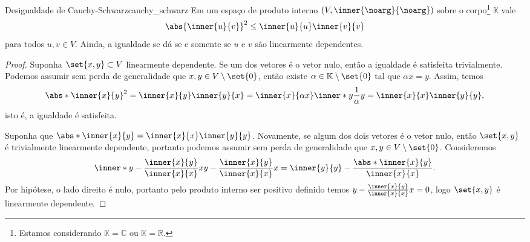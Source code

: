 \begin{lemma}{Desigualdade de Cauchy-Schwarz}{cauchy_schwarz}
    Em um espaço de produto interno \((V, \inner{\noarg}{\noarg})\) sobre o corpo\footnote{Estamos considerando \(\mathbb{K} = \mathbb{C}\) ou \(\mathbb{K} = \mathbb{R}.\)} \(\mathbb{K}\) vale
    \begin{equation*}
        \abs{\inner{u}{v}}^2 \leq \inner{u}{u} \inner{v}{v}
    \end{equation*}
    para todos \(u, v \in V.\) Ainda, a igualdade se dá se e somente se \(u\) e \(v\) são linearmente dependentes.
\end{lemma}
\begin{proof}
     Suponha \(\set{x,y} \subset V\) linearmente dependente. Se um dos vetores é o vetor nulo, então a igualdade é satisfeita trivialmente. Podemos assumir sem perda de generalidade que \(x, y \in V\setminus\set{0}\), então existe \(\alpha \in \mathbb{K}\setminus\set{0}\) tal que \(\alpha x = y\). Assim, temos
    \begin{equation*}
        \abs*{\inner{x}{y}}^2 = \inner{x}{y}\inner{y}{x} = \inner{x}{\alpha x}\inner*{y}{\frac1\alpha y} = \inner{x}{x} \inner{y}{y},
    \end{equation*}
    isto é, a igualdade é satisfeita.

    Suponha que \(\abs*{\inner{x}{y}} = \inner{x}{x} \inner{y}{y}\). Novamente, se algum dos dois vetores é o vetor nulo, então \(\set{x,y}\) é trivialmente linearmente dependente, portanto podemos assumir sem perda de generalidade que \(x, y \in V \setminus\set{0}\). Consideremos
    \begin{equation*}
        \inner*{y - \frac{\inner{x}{y}}{\inner{x}{x}}x}{y - \frac{\inner{x}{y}}{\inner{x}{x}}x} = \inner{y}{y} - \frac{\abs*{\inner{x}{y}}}{\inner{x}{x}}.
    \end{equation*}
    Por hipótese, o lado direito é nulo, portanto pelo produto interno ser positivo definido temos \(y - \frac{\inner{x}{y}}{\inner{x}{x}}x = 0\), logo \(\set{x,y}\) é linearmente dependente.
\end{proof}

